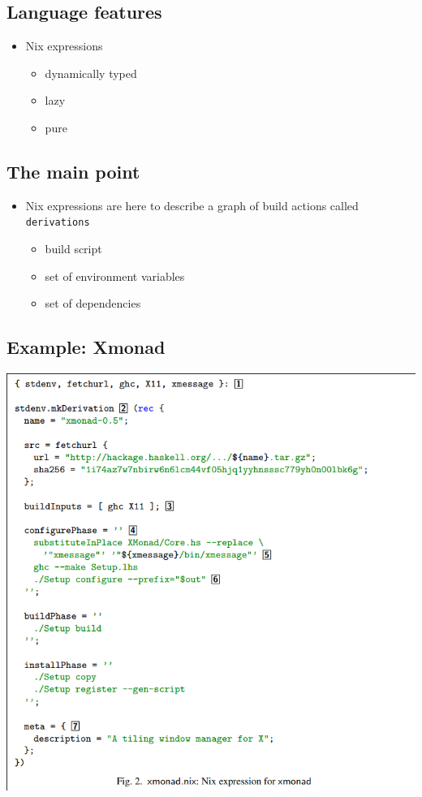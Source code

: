 \documentclass[11pt]{article}
\begin{document}
\subsection{Language features}
\label{sec:org504698b}
\begin{itemize}
\item Nix expressions
\begin{itemize}
\item dynamically typed
\item lazy
\item pure
\end{itemize}
\end{itemize}
\subsection{The main point}
\label{sec:orgaf2cc5c}
\begin{itemize}
\item Nix expressions are here to describe a graph of build actions
called \texttt{derivations}
\begin{itemize}
\item build script
\item set of environment variables
\item set of dependencies
\end{itemize}
\end{itemize}
\subsection{Example: Xmonad}
\label{sec:orga6ed150}
\begin{center}
\includegraphics[width=.9\linewidth]{./images/screenshot-06.png}
\end{center}
\end{document}
